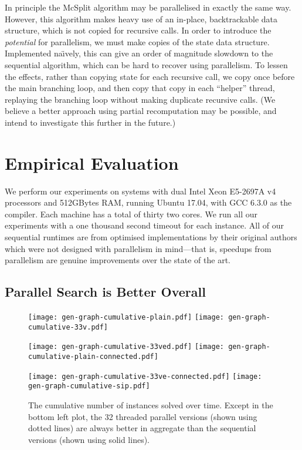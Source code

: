 \documentclass{llncs}
\begin{document}
In principle the McSplit algorithm may be parallelised in exactly the same way. However, this
algorithm makes heavy use of an in-place, backtrackable data structure, which is not copied for
recursive calls. In order to introduce the \emph{potential} for parallelism, we must make
copies of the state data structure. Implemented na{\"\i}vely, this can give an order of magnitude
slowdown to the sequential algorithm, which can be hard to recover using parallelism. To lessen the
effects, rather than copying state for each recursive call, we copy once before the main branching
loop, and then copy that copy in each ``helper'' thread, replaying the branching loop without making
duplicate recursive calls.  (We believe a better approach using partial recomputation may be
possible, and intend to investigate this further in the future.)

\section{Empirical Evaluation}

We perform our experiments on systems with dual Intel Xeon E5-2697A v4 processors and 512GBytes RAM,
running Ubuntu 17.04, with GCC 6.3.0 as the compiler. Each machine has a total of thirty two cores.
We run all our experiments with a one thousand second timeout for each instance. All of our
sequential runtimes are from optimised implementations by their original authors which were not
designed with parallelism in mind---that is, speedups from parallelism are genuine improvements over
the state of the art.

\subsection{Parallel Search is Better Overall}

\begin{figure}[p]
    \texttt{[image: gen-graph-cumulative-plain.pdf]}
    \hfill
    \texttt{[image: gen-graph-cumulative-33v.pdf]}

    \vspace*{1em}

    \texttt{[image: gen-graph-cumulative-33ved.pdf]}
    \hfill
    \texttt{[image: gen-graph-cumulative-plain-connected.pdf]}

    \vspace*{1em}

    \texttt{[image: gen-graph-cumulative-33ve-connected.pdf]}
    \hfill
    \texttt{[image: gen-graph-cumulative-sip.pdf]}

    \caption{The cumulative number of instances solved over time. Except in the bottom left plot,
    the 32 threaded parallel versions (shown using dotted lines) are always better in aggregate than
    the sequential versions (shown using solid lines).}\label{figure:cumulative}
\end{figure}
\end{document}
